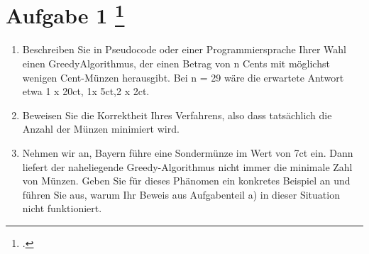 \documentclass{lehramt-informatik-aufgabe}
\begin{document}

\section{Aufgabe 1
\footcite[Thema 1 Aufgabe 1]{examen:66115:2007:03}}

\begin{enumerate}


\item Beschreiben Sie in Pseudocode oder einer Programmiersprache Ihrer
Wahl einen GreedyAlgorithmus, der einen Betrag von n Cents mit möglichst
wenigen Cent-Münzen herausgibt. Bei n = 29 wäre die erwartete Antwort
etwa 1 x 20ct, 1x 5ct,2 x 2ct.


\item Beweisen Sie die Korrektheit Ihres Verfahrens, also dass
tatsächlich die Anzahl der Münzen minimiert wird.


\item Nehmen wir an, Bayern führe eine Sondermünze im Wert von 7ct ein.
Dann liefert der naheliegende Greedy-Algorithmus nicht immer die
minimale Zahl von Münzen. Geben Sie für dieses Phänomen ein konkretes
Beispiel an und führen Sie aus, warum Ihr Beweis aus Aufgabenteil a) in
dieser Situation nicht funktioniert.
\end{enumerate}
\end{document}
